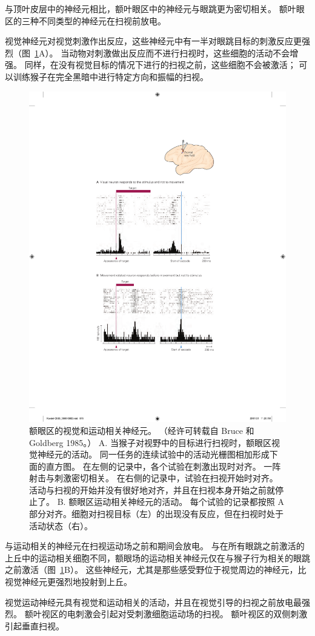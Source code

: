 与顶叶皮层中的神经元相比，额叶眼区中的神经元与眼跳更为密切相关。
额叶眼区的三种不同类型的神经元在扫视前放电。


视觉神经元对视觉刺激作出反应，这些神经元中有一半对眼跳目标的刺激反应更强烈（图~\ref{fig:35_13}A）。
当动物对刺激做出反应而不进行扫视时，这些细胞的活动不会增强。
同样，在没有视觉目标的情况下进行的扫视之前，这些细胞不会被激活；
可以训练猴子在完全黑暗中进行特定方向和振幅的扫视。


\begin{figure}[htbp]
	\centering
	\includegraphics[width=0.65\linewidth]{chap35/fig_35_13}
	\caption{额眼区的视觉和运动相关神经元。 （经许可转载自 Bruce 和 Goldberg 1985。） A. 当猴子对视野中的目标进行扫视时，额眼区视觉神经元的活动。 同一任务的连续试验中的活动光栅图相加形成下面的直方图。 在左侧的记录中，各个试验在刺激出现时对齐。 一阵射击与刺激密切相关。 在右侧的记录中，试验在扫视开始时对齐。 活动与扫视的开始并没有很好地对齐，并且在扫视本身开始之前就停止了。 B. 额眼区运动相关神经元的活动。 每个试验的记录都按照 A 部分对齐。细胞对扫视目标（左）的出现没有反应，但在扫视时处于活动状态（右）。}
	\label{fig:35_13}
\end{figure}


与运动相关的神经元在扫视运动场之前和期间会放电。
与在所有眼跳之前激活的上丘中的运动相关细胞不同，额眼场的运动相关神经元仅在与猴子行为相关的眼跳之前激活（图~\ref{fig:35_13}B）。
这些神经元，尤其是那些感受野位于视觉周边的神经元，比视觉神经元更强烈地投射到上丘。


视觉运动神经元具有视觉和运动相关的活动，并且在视觉引导的扫视之前放电最强烈。
额叶视区的电刺激会引起对受刺激细胞运动场的扫视。 额叶视区的双侧刺激引起垂直扫视。


